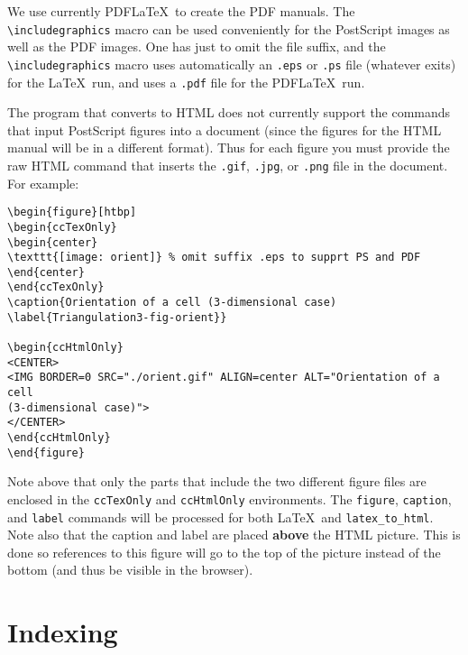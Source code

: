 We use currently PDF\LaTeX\ to create the PDF manuals. The
\verb|\includegraphics| macro can be used conveniently for the
PostScript images as well as the PDF images. One has just to omit the
file suffix, and the \verb|\includegraphics| macro uses automatically
an \texttt{.eps} or \texttt{.ps} file (whatever exits) for the \LaTeX\
run, and uses a \texttt{.pdf} file for the PDF\LaTeX\ run.

The program that converts to HTML does not currently support
the commands that input PostScript figures into a document (since the figures
for the HTML manual will be in a different format).  Thus for each figure
you must provide the raw HTML command that inserts the {\tt .gif},
{\tt .jpg}, or {\tt .png} file in the
document.  For example: 

\begin{verbatim}
\begin{figure}[htbp]
\begin{ccTexOnly}
\begin{center}
\texttt{[image: orient]} % omit suffix .eps to supprt PS and PDF
\end{center}
\end{ccTexOnly}
\caption{Orientation of a cell (3-dimensional case)
\label{Triangulation3-fig-orient}}

\begin{ccHtmlOnly}
<CENTER>
<IMG BORDER=0 SRC="./orient.gif" ALIGN=center ALT="Orientation of a cell
(3-dimensional case)">
</CENTER>
\end{ccHtmlOnly}
\end{figure}
\end{verbatim}

Note above that only the parts that include the two different figure files
are enclosed in the {\tt ccTexOnly} and {\tt ccHtmlOnly} environments.
The {\tt figure}, {\tt caption}, and {\tt label} commands will be processed
for both \LaTeX\  and {\tt latex\_to\_html}.
Note also that the caption and label are placed {\bf above} the HTML picture.  
This is done so references to this figure will go to the top of the picture
instead of the bottom (and thus be visible in the browser).


\section{Indexing}
\label{sec:indexing}


